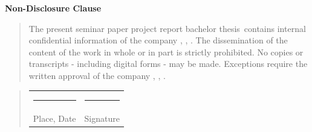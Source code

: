 \begin{titlepage}
	\begin{center}
		\vspace*{1cm}
		\Huge\bf Non-Disclosure Clause\\
		\vspace*{2cm}
		\normalsize\rm
		\begin{quotation}
			\parbox{0.8\textwidth}{The present \ifcase\myType seminar paper \or project report \or bachelor thesis\else\fi ~contains internal confidential information of the company \myCompany, \myCompanyAddressStreet, \myCompanyAddressCity. The dissemination of the content of the work in whole or in part is strictly prohibited. No copies or transcripts - including digital forms - may be made. Exceptions require the written approval of the company \myCompany, \myCompanyAddressStreet, \myCompanyAddressCity.}
		\end{quotation}
		\vspace*{1cm}
		\begin{quotation}
		  \parbox{0.8\textwidth}{
		  \begin{tabularx}{0.78\textwidth}{l@{\extracolsep\fill}l}
				\rule{4cm}{0.3mm}&\rule{4cm}{0.3mm}\\
	    	Place, Date&Signature
			\end{tabularx}}
		\end{quotation}
	\end{center}
\end{titlepage}
\newpage
\setcounter{page}{3}
